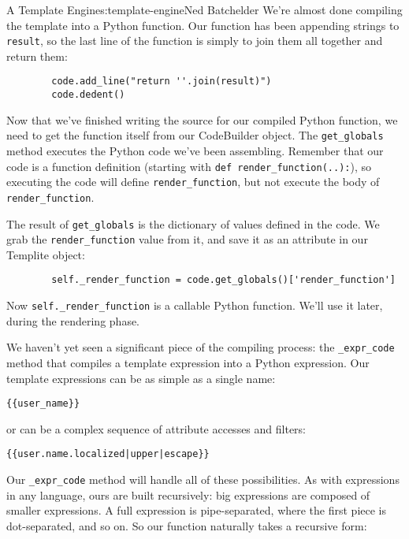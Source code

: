 \begin{aosachapter}{A Template Engine}{s:template-engine}{Ned Batchelder}
We're almost done compiling the template into a Python function. Our
function has been appending strings to \texttt{result}, so the last line
of the function is simply to join them all together and return them:

\begin{verbatim}
        code.add_line("return ''.join(result)")
        code.dedent()
\end{verbatim}

Now that we've finished writing the source for our compiled Python
function, we need to get the function itself from our CodeBuilder
object. The \texttt{get\_globals} method executes the Python code we've
been assembling. Remember that our code is a function definition
(starting with \texttt{def render\_function(..):}), so executing the
code will define \texttt{render\_function}, but not execute the body of
\texttt{render\_function}.

The result of \texttt{get\_globals} is the dictionary of values defined
in the code. We grab the \texttt{render\_function} value from it, and
save it as an attribute in our Templite object:

\begin{verbatim}
        self._render_function = code.get_globals()['render_function']
\end{verbatim}

Now \texttt{self.\_render\_function} is a callable Python function.
We'll use it later, during the rendering phase.

\label{compiling-expressions}

We haven't yet seen a significant piece of the compiling process: the
\texttt{\_expr\_code} method that compiles a template expression into a
Python expression. Our template expressions can be as simple as a single
name:

\begin{verbatim}
{{user_name}}
\end{verbatim}

or can be a complex sequence of attribute accesses and filters:

\begin{verbatim}
{{user.name.localized|upper|escape}}
\end{verbatim}

Our \texttt{\_expr\_code} method will handle all of these possibilities.
As with expressions in any language, ours are built recursively: big
expressions are composed of smaller expressions. A full expression is
pipe-separated, where the first piece is dot-separated, and so on. So
our function naturally takes a recursive form:


\end{aosachapter}
